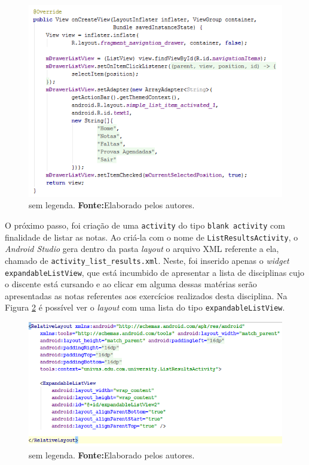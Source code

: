 	\begin{figure}[h!] 
		\centerline{\includegraphics[scale=0.7]{./imagens/2_q_metodologico/4_procedimentos_resultados/42_aplicativo/aplicativo1.png}}
		\caption[sem legenda]{sem legenda. \textbf{Fonte:}Elaborado pelos autores.}
		\label{fig:aplicativo1}
	\end{figure}
	
	\pagebreak
	
	\par O próximo passo, foi criação de uma \texttt{activity} do tipo
\texttt{blank activity} com finalidade de listar as notas. Ao criá-la com o
nome de \texttt{ListResultsActivity}, o \textit{Android Studio} gera dentro da
pasta \textit{layout} o arquivo XML referente a ela, chamado de
\texttt{activity\_list\_results.xml}. Neste, foi inserido apenas o
\textit{widget} \texttt{expandableListView}, que está incumbido de apresentar a
lista de disciplinas cujo o discente está cursando e ao clicar em alguma dessas
matérias serão apresentadas as notas referentes aos exercícios realizados desta
disciplina. Na Figura \ref{fig:aplicativo2} é possível ver o \textit{layout} com uma
lista do tipo \texttt{expandableListView}.


	\begin{figure}[h!] 
		\centerline{\includegraphics[scale=0.7]{./imagens/2_q_metodologico/4_procedimentos_resultados/42_aplicativo/aplicativo2.png}}
		\caption[sem legenda]{sem legenda. \textbf{Fonte:}Elaborado pelos autores.}
		\label{fig:aplicativo2}
	\end{figure}
	
